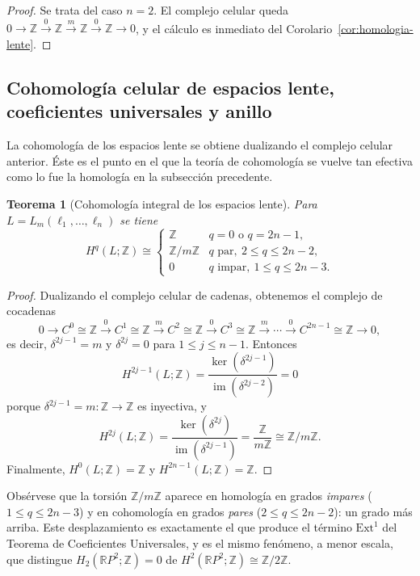 \documentclass[11pt,a4paper]{article}
\theoremstyle{plain}
\newtheorem{theorem}{Teorema}[section]
\theoremstyle{definition}
\theoremstyle{remark}
\newcommand{\RR}{\mathbb R}
\newcommand{\ZZ}{\mathbb Z}
\DeclareMathOperator{\im}{im}
\begin{document}
\begin{proof}
Se trata del caso $n=2$. El complejo celular queda
$0\to\ZZ\xrightarrow{0}\ZZ\xrightarrow{m}\ZZ\xrightarrow{0}\ZZ\to0$, y el
cálculo es inmediato del Corolario~\ref{cor:homologia-lente}.
\end{proof}

\subsection{Cohomología celular de espacios lente, coeficientes universales y anillo}
\label{sec:anillo-cohomologia-lente}

La cohomología de los espacios lente se obtiene dualizando el complejo
celular anterior. Éste es el punto en el que la teoría de cohomología se
vuelve tan efectiva como lo fue la homología en la subsección precedente.

\begin{theorem}[Cohomología integral de los espacios lente]
\label{thm:cohomologia-lente}
Para $L=L_m(\ell_1,\dots,\ell_n)$ se tiene
\[
H^q(L;\ZZ)\cong\begin{cases}
\ZZ & q=0\text{ o }q=2n-1,\\
\ZZ/m\ZZ & q\text{ par},\ 2\le q\le2n-2,\\
0 & q\text{ impar},\ 1\le q\le2n-3.
\end{cases}
\]
\end{theorem}

\begin{proof}
Dualizando el complejo celular de cadenas, obtenemos el complejo de
cocadenas
\[
0\to C^0\cong\ZZ\xrightarrow{0}C^1\cong\ZZ\xrightarrow{m}C^2\cong\ZZ\xrightarrow{0}C^3\cong\ZZ\xrightarrow{m}\cdots\xrightarrow{0}C^{2n-1}\cong\ZZ\to0,
\]
es decir, $\delta^{2j-1}=m$ y $\delta^{2j}=0$ para $1\le j\le n-1$.
Entonces
\[
H^{2j-1}(L;\ZZ)=\frac{\ker(\delta^{2j-1})}{\im(\delta^{2j-2})}=0
\]
porque $\delta^{2j-1}=m:\ZZ\to\ZZ$ es inyectiva, y
\[
H^{2j}(L;\ZZ)=\frac{\ker(\delta^{2j})}{\im(\delta^{2j-1})}=\frac{\ZZ}{m\ZZ}\cong\ZZ/m\ZZ.
\]
Finalmente, $H^0(L;\ZZ)=\ZZ$ y $H^{2n-1}(L;\ZZ)=\ZZ$.
\end{proof}

Obsérvese que la torsión $\ZZ/m\ZZ$ aparece en homología en grados
\emph{impares} ($1\le q\le2n-3$) y en cohomología en grados \emph{pares}
($2\le q\le2n-2$): un grado más arriba. Este desplazamiento es exactamente
el que produce el término $\mathrm{Ext}^1$ del Teorema de Coeficientes
Universales, y es el mismo fenómeno, a menor escala, que distingue
$H_2(\RR P^2;\ZZ)=0$ de $H^2(\RR P^2;\ZZ)\cong\ZZ/2\ZZ$.
\end{document}
